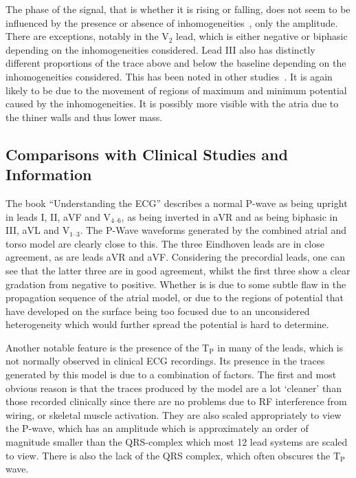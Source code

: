 The phase of the signal, that is whether it is rising or falling, does not seem
to be influenced by the presence or absence of
inhomogeneities~\cite{Rudy2006,Gulrajani1983}, only the amplitude.
There are exceptions, notably in the $\text{V}_{\text{2}}$ lead, which is either
negative or biphasic depending on the inhomogeneities considered.
Lead III also has distinctly different proportions of the trace above and below
the baseline depending on the inhomogeneities considered.
This has been noted in other studies~\cite{vanDam2005}.
It is again likely to be due to the movement of regions of maximum and minimum
potential caused by the inhomogeneities.
It is possibly more visible with the atria due to the thiner walls and thus
lower mass.

\subsection{Comparisons with Clinical Studies and Information}

The book ``Understanding the ECG'' describes a normal P-wave as being upright in
leads I, II, aVF and $\text{V}_{\text{4--6}}$, as being inverted in aVR and as
being biphasic in III, aVL and $\text{V}_{\text{1--3}}$.
The P-Wave waveforms generated by the combined atrial and torso model are
clearly close to this.
The three Eindhoven leads are in close agreement, as are leads aVR and aVF.
Considering the precordial leads, one can see that the latter three are in good
agreement, whilst the first three show a clear gradation from negative to
positive.
Whether is is due to some subtle flaw in the propagation sequence of the atrial
model, or due to the regions of potential that have developed on the surface
being too focused due to an unconsidered heterogeneity which would further
spread the potential is hard to determine.

Another notable feature is the presence of the $\text{T}_{\text{P}}$ in many of
the leads, which is not normally observed in clinical ECG recordings.
Its presence in the traces generated by this model is due to a combination of
factors.
The first and most obvious reason is that the traces produced by the model are a
lot `cleaner' than those recorded clinically since there are no problems due to
RF interference from wiring, or skeletal muscle activation.
They are also scaled appropriately to view the P-wave, which has an
amplitude which is approximately an order of magnitude smaller than the
QRS-complex which most 12 lead systems are scaled to view.
There is also the lack of the QRS complex, which often obscures the
$\text{T}_{\text{P}}$ wave.

